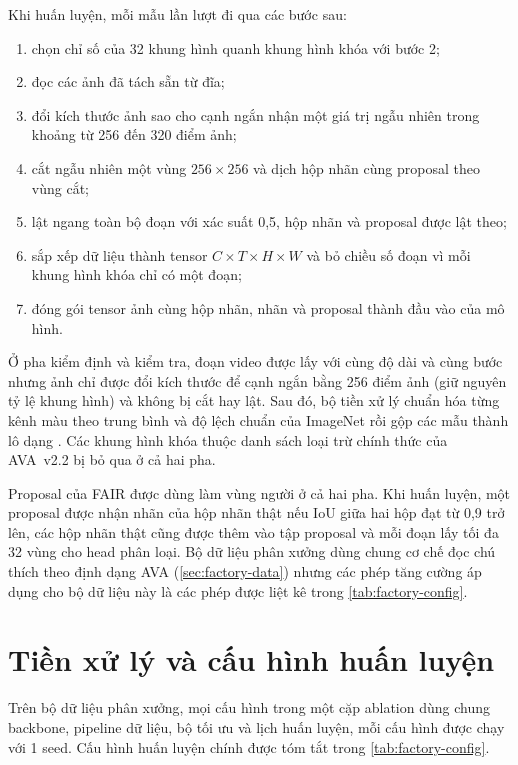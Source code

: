 Khi huấn luyện, mỗi mẫu lần lượt đi qua các bước sau:
\begin{enumerate}
  \item {} chọn chỉ số của 32 khung hình quanh khung hình khóa với bước 2;
  \item {} đọc các ảnh đã tách sẵn từ đĩa;
  \item {} đổi kích thước ảnh sao cho cạnh ngắn nhận một giá trị ngẫu nhiên trong khoảng từ 256 đến 320 điểm ảnh;
  \item {} cắt ngẫu nhiên một vùng $256 \times 256$ và dịch hộp nhãn cùng proposal theo vùng cắt;
  \item {} lật ngang toàn bộ đoạn với xác suất 0,5, hộp nhãn và proposal được lật theo;
  \item {} sắp xếp dữ liệu thành tensor $C \times T \times H \times W$ và bỏ chiều số đoạn vì mỗi khung hình khóa chỉ có một đoạn;
  \item {} đóng gói tensor ảnh cùng hộp nhãn, nhãn và proposal thành đầu vào của mô hình.
\end{enumerate}
Ở pha kiểm định và kiểm tra, đoạn video được lấy với cùng độ dài và cùng bước nhưng ảnh chỉ được đổi kích thước để cạnh ngắn bằng 256 điểm ảnh (giữ nguyên tỷ lệ khung hình) và không bị cắt hay lật. Sau đó, bộ tiền xử lý  chuẩn hóa từng kênh màu theo trung bình và độ lệch chuẩn của ImageNet rồi gộp các mẫu thành lô dạng . Các khung hình khóa thuộc danh sách loại trừ chính thức của AVA~v2.2 bị bỏ qua ở cả hai pha.

Proposal của FAIR được dùng làm vùng người ở cả hai pha. Khi huấn luyện, một proposal được nhận nhãn của hộp nhãn thật nếu IoU giữa hai hộp đạt từ 0,9 trở lên, các hộp nhãn thật cũng được thêm vào tập proposal và mỗi đoạn lấy tối đa 32 vùng cho head phân loại. Bộ dữ liệu phân xưởng dùng chung cơ chế đọc chú thích theo định dạng AVA (\cref{sec:factory-data}) nhưng các phép tăng cường áp dụng cho bộ dữ liệu này là các phép được liệt kê trong \cref{tab:factory-config}.

\section{Tiền xử lý và cấu hình huấn luyện}
\label{sec:training-config}

Trên bộ dữ liệu phân xưởng, mọi cấu hình trong một cặp ablation dùng chung backbone, pipeline dữ liệu, bộ tối ưu và lịch huấn luyện, mỗi cấu hình được chạy với 1 seed. Cấu hình huấn luyện chính được tóm tắt trong \cref{tab:factory-config}.

